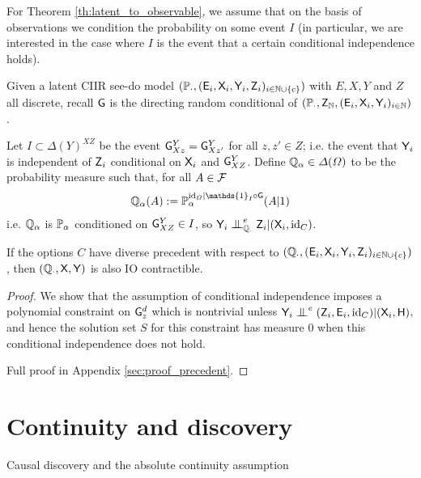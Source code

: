 For Theorem \ref{th:latent_to_observable}, we assume that on the basis of observations we condition the probability on some event $I$ (in particular, we are interested in the case where $I$ is the event that a certain conditional independence holds).

\begin{theorem}\label{th:latent_to_observable}
Given a latent CIIR see-do model $(\mathbb{P}_\cdot,(\mathsf{E}_i,\mathsf{X}_i,\mathsf{Y}_i,\mathsf{Z}_i)_{i\in\mathbb{N}\cup\{c\}})$ with $E,X,Y$ and $Z$ all discrete, recall $\mathsf{G}$ is the directing random conditional of $(\mathbb{P}_\cdot,\mathsf{Z}_{\mathbb{N}},(\mathsf{E}_i,\mathsf{X}_i,\mathsf{Y}_i)_{i\in \mathbb{N}})$.

Let $I\subset \Delta(Y)^{XZ}$ be the event $\mathsf{G}^Y_{Xz}=\mathsf{G}^Y_{Xz'}$ for all $z,z'\in Z$; i.e. the event that $\mathsf{Y}_i$ is independent of $\mathsf{Z}_i$ conditional on $\mathsf{X}_i$ and $\mathsf{G}^Y_{XZ}$. Define $\mathbb{Q}_\alpha\in \Delta(\Omega)$ to be the probability measure such that, for all $A\in \mathcal{F}$
\begin{align}
\prob{Q}_\alpha(A) := \prob{P}_\alpha^{\mathrm{id}_\Omega|\mathds{1}_I\circ \RV{G}}(A|1)
\end{align}
i.e. $\mathbb{Q}_\alpha$ is $\mathbb{P}_\alpha$ conditioned on $\mathsf{G}^Y_{XZ}\in I$, so $\RV{Y}_i\CI^e_{\prob{Q}_\cdot} \RV{Z}_i|(\RV{X}_i,\mathrm{id}_C)$.

If the options $C$ have diverse precedent with respect to $(\mathbb{Q}_\cdot,(\mathsf{E}_i,\mathsf{X}_i,\mathsf{Y}_i,\mathsf{Z}_i)_{i\in\mathbb{N}\cup\{c\}})$, then $(\mathbb{Q}_\cdot,\mathsf{X},\mathsf{Y})$ is also IO contractible.
\end{theorem}

\begin{proof}
We show that the assumption of conditional independence imposes a polynomial constraint on $\mathsf{G}^d_z$ which is nontrivial unless $\RV{Y}_i\CI^e (\RV{Z}_i,\RV{E}_i,\text{id}_C)|(\RV{X}_i,\RV{H})$, and hence the solution set $S$ for this constraint has measure 0 when this conditional independence does not hold.

Full proof in Appendix \ref{sec:proof_precedent}.
\end{proof}

\section{Continuity and discovery}{Causal discovery and the absolute continuity assumption}

